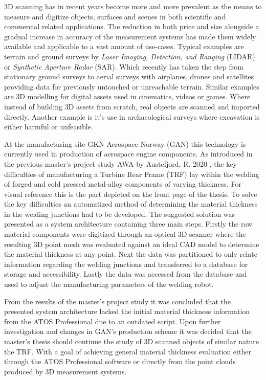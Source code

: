 \documentclass[%
]{USN-MSc}
\begin{document}
3D scanning has in recent years become more and more prevalent as the means to measure and digitize objects, surfaces and scenes in both scientific and commercial related applications. The reduction in both price and size alongside a gradual increase in accuracy of the measurement systems has made them widely available and applicable to a vast amount of use-cases. Typical examples are terrain and ground surveys by \textit{Laser Imaging, Detection, and Ranging} (LIDAR) or \textit{Synthetic Aperture Radar} (SAR). Which recently has taken the step from stationary ground surveys to aerial surveys with airplanes, drones and satellites providing data for previously untouched or unreachable terrain. Similar examples are 3D modelling for digital assets used in cinematics, videos or games. Where instead of building 3D assets from scratch, real objects are scanned and imported directly. Another example is it's use in archaeological surveys where excavation is either harmful or unfeasible.

At the manufacturing site GKN Aerospace Norway (GAN) this technology is currently used in production of aerospace engine components. As introduced in the previous master's project study AWA by Austefjord, R. 2020  \cite{Adaptive-Welding-Automation}, the key difficulties of manufacturing a Turbine Rear Frame (TRF) lay within the welding of forged and cold pressed metal-alloy components of varying thickness. For visual reference this is the part depicted on the front page of the thesis. To solve the key difficulties an automatized method of determining the material thickness in the welding junctions had to be developed. The suggested solution was presented as a system architecture containing three main steps. Firstly the raw material components were digitized through an optical 3D scanner where the resulting 3D point mesh was evaluated against an ideal CAD model to determine the material thickness at any point. Next the data was partitioned to only relate information regarding the welding junctions and transferred to a database for storage and accessibility. Lastly the data was accessed from the database and used to adjust the manufacturing parameters of the welding robot.

From the results of the master's project study it was concluded that the presented system architecture lacked the initial material thickness information from the ATOS Professional due to an outdated script. Upon further investigation and changes in GAN's production scheme it was decided that the master's thesis should continue the study of 3D scanned objects of similar nature the TRF. With a goal of achieving general material thickness evaluation either through the ATOS Professional software or directly from the point clouds produced by 3D measurement systems. 
\end{document}
